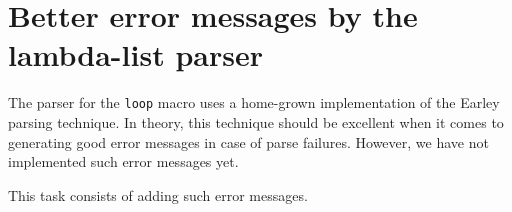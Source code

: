 \section{Better error messages by the lambda-list parser}

The parser for the \texttt{loop} macro uses a home-grown
implementation of the Earley parsing technique.  In theory, this
technique should be excellent when it comes to generating good error
messages in case of parse failures.  However, we have not implemented
such error messages yet.

This task consists of adding such error messages.
